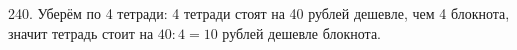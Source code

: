 240. Уберём по 4 тетради: 4 тетради стоят на 40 рублей дешевле, чем 4 блокнота, значит тетрадь стоит на $40:4=10$ рублей дешевле блокнота.\\
